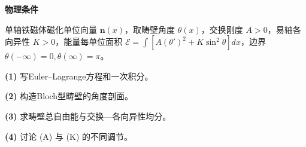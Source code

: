 \textbf{物理条件}\par 单轴铁磁体磁化单位向量 \(\boldsymbol n(x)\)，取畴壁角度 \(\theta(x)\)，交换刚度 \(A>0\)，易轴各向异性 \(K>0\)，能量每单位面积 \(\mathcal E=\int[A(\theta')^2+K\sin^2\theta]dx\)，边界 \(\theta(-\infty)=0,\theta(\infty)=\pi\)。
\par\noindent\textbf{(1)} 写Euler–Lagrange方程和一次积分。
\par\noindent\textbf{(2)} 构造Bloch型畴壁的角度剖面。
\par\noindent\textbf{(3)} 求畴壁总自由能与交换—各向异性均分。
\par\noindent\textbf{(4)} 讨论 (A) 与 (K) 的不同调节。
